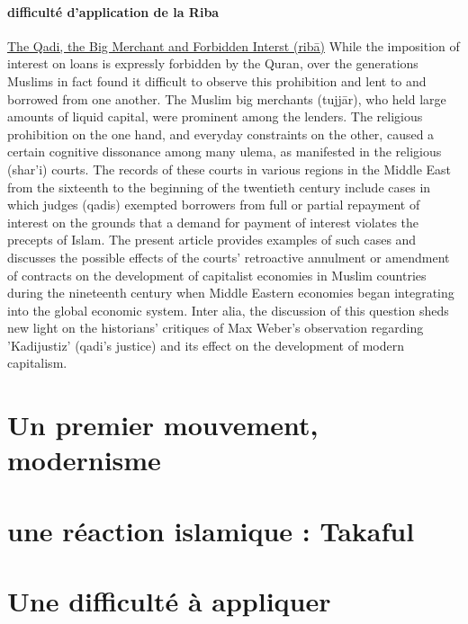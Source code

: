 \paragraph{difficulté d'application de la Riba} \href{https://www-jstor-org.icp.idm.oclc.org/stable/23264404}{The Qadi, the Big Merchant and Forbidden Interst (ribā)} While the imposition of interest on loans is expressly forbidden by the Quran, over the generations Muslims in fact found it difficult to observe this prohibition and lent to and borrowed from one another. The Muslim big merchants (tujjār), who held large amounts of liquid capital, were prominent among the lenders. The religious prohibition on the one hand, and everyday constraints on the other, caused a certain cognitive dissonance among many ulema, as manifested in the religious (shar'i) courts. The records of these courts in various regions in the Middle East from the sixteenth to the beginning of the twentieth century include cases in which judges (qadis) exempted borrowers from full or partial repayment of interest on the grounds that a demand for payment of interest violates the precepts of Islam. The present article provides examples of such cases and discusses the possible effects of the courts' retroactive annulment or amendment of contracts on the development of capitalist economies in Muslim countries during the nineteenth century when Middle Eastern economies began integrating into the global economic system. Inter alia, the discussion of this question sheds new light on the historians' critiques of Max Weber's observation regarding 'Kadijustiz' (qadi's justice) and its effect on the development of modern capitalism.
\section{Un premier mouvement, modernisme}

\section{une réaction islamique : Takaful}

\section{Une difficulté à appliquer}


